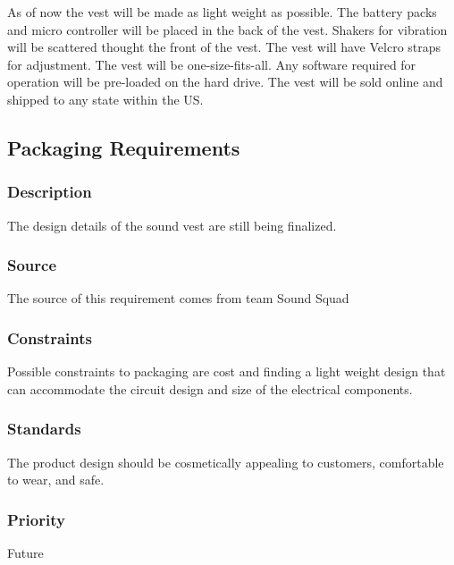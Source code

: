As of now the vest will be made as light weight as possible. The battery packs and micro controller will be placed in the back of the vest. Shakers for vibration will be scattered thought the front of the vest. The vest will have Velcro straps for adjustment. The vest will be one-size-fits-all. Any software required for operation will be pre-loaded on the hard drive. The vest will be sold online and shipped to any state within the US.

\subsection{Packaging Requirements}
\subsubsection{Description}
The design details of the sound vest are still being finalized.
\subsubsection{Source}
The source of this requirement comes from team Sound Squad
\subsubsection{Constraints}
Possible constraints to packaging are cost and finding a light weight design that can accommodate the circuit design and size of the electrical components. 
\subsubsection{Standards}
The product design should be cosmetically appealing to customers, comfortable to wear, and safe.
\subsubsection{Priority}
Future
